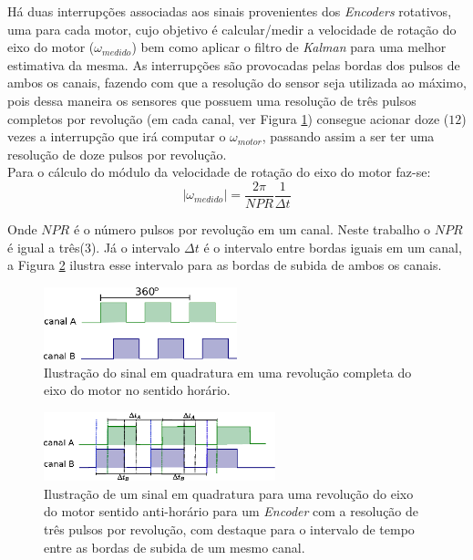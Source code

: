 Há duas interrupções associadas aos sinais provenientes dos \emph{Encoders} rotativos, uma para cada motor, cujo objetivo é calcular/medir a velocidade de rotação do eixo do motor ($\omega_{medido}$) bem como aplicar o filtro de \emph{Kalman} para uma melhor estimativa da mesma. As interrupções são provocadas pelas bordas dos pulsos de ambos os canais, fazendo com que a resolução do sensor seja utilizada ao máximo, pois dessa maneira os sensores que possuem uma resolução de três pulsos completos por revolução (em cada canal, ver Figura \ref{fig:ilustracao_uma_revolucao}) consegue acionar doze ($12$) vezes a interrupção que irá computar o $\omega_{motor}$, passando assim a ser ter uma resolução de doze pulsos por revolução.\\

Para o cálculo do módulo da velocidade de rotação do eixo do motor faz-se:
\begin{equation}
    |\omega_{medido}| = \frac{2\pi}{NPR}\frac{1}{\Delta{t}}
    \label{eq:modulo_omega_medido}
\end{equation}

Onde $NPR$ é o número pulsos por revolução em um canal. Neste trabalho o $NPR$ é igual a três($3$). Já o intervalo $\Delta{t}$ é o intervalo entre bordas iguais em um canal, a Figura \ref{fig:sinal_em_quadratura_delta_t} ilustra esse intervalo para as bordas de subida de ambos os canais.\\

\begin{figure}[H]
    \centering
    \includegraphics[width=0.5\textwidth]{imagens/ilustracoes/sinal_enquadratura_uma_revolucao.eps}
    \caption{Ilustração do sinal em quadratura em uma revolução completa do eixo do motor no sentido horário.}
    \label{fig:ilustracao_uma_revolucao}
\end{figure}

\begin{figure}[H]
    \centering
    \includegraphics[width=0.6\textwidth]{imagens/ilustracoes/sinal_em_quadratura_sentido_CCW_detalhada.eps}
    \caption{Ilustração de um sinal em quadratura para uma revolução do eixo do motor sentido anti-horário para um \emph{Encoder} com a resolução de três pulsos por revolução, com destaque para o intervalo de tempo entre as bordas de subida de um mesmo canal.}
    \label{fig:sinal_em_quadratura_delta_t}
\end{figure}

